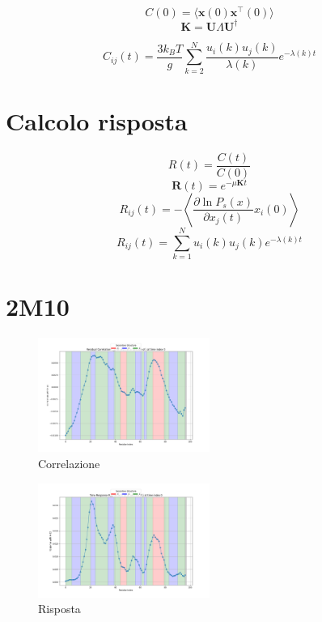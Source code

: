 \documentclass{article}
\begin{document}
\begin{equation}
    C(0) = \langle \mathbf{x}(0) \mathbf{x}^\top(0) \rangle
    \end{equation}
\begin{equation}
    \mathbf{K} = \mathbf{U} \Lambda \mathbf{U}^\dagger
    \end{equation}
        
\begin{equation}
    C_{ij}(t) = \frac{3 k_B T}{g} \sum_{k=2}^{N} \frac{u_i(k) u_j(k)}{\lambda(k)} e^{-\lambda(k) t}
    \end{equation}
        
\section{Calcolo risposta}
\begin{equation}
    R(t) = \frac{C(t)}{C(0)}
    \end{equation}
\begin{equation}
    \mathbf{R}(t) = e^{-\mu \mathbf{K} t}
    \end{equation}
\begin{equation}
    R_{ij}(t) = - \left\langle \frac{\partial \ln P_s(x)}{\partial x_j(t)} x_i(0) \right\rangle
    \end{equation}
\begin{equation}
    R_{ij}(t) = \sum_{k=1}^{N} u_i(k) u_j(k) e^{-\lambda(k) t}
    \end{equation}




\section{2M10}
\begin{figure}[h]
    \centering
    \includegraphics[width=0.5\textwidth]{images/Residual Correlation C_ij for i=22 as a function of j at time index 0.png}
    \caption{Correlazione}
\end{figure}
\begin{figure}[h]
    \centering
    \includegraphics[width=0.5\textwidth]{images/Time Response R_ij for i=22 as a function of j at time index 0.png}
    \caption{Risposta}
\end{figure}
\end{document}
